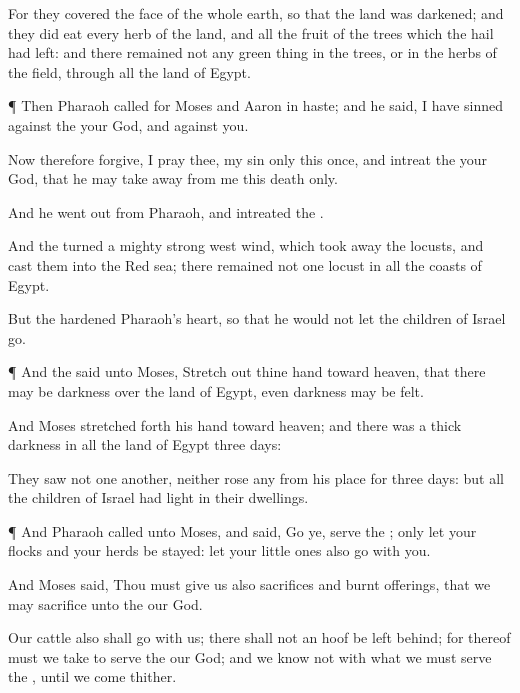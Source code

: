 {For they
covered the
face of the whole
earth, so that the
land was
darkened; and they did
eat every
herb of the
land, and all the
fruit of the
trees which the
hail had
left: and there
remained not any green
thing in the
trees, or in the
herbs of the
field, through all the
land of
Egypt.


\par }{\PP {}¶ Then
Pharaoh
called for
Moses and
Aaron in
haste; and he
said, I have
sinned against the
{} your
God, and against you.

Now therefore
forgive, I pray thee, my
sin only this
once, and
intreat the
{} your
God, that he may take
away from me this
death only.

And he went
out from
Pharaoh, and
intreated the
{}.

And the
{}
turned a
mighty
strong
west
wind, which took
away the
locusts, and
cast them into the
Red
sea; there
remained not
one
locust in all the
coasts of
Egypt.

But the
{}
hardened
Pharaoh’s
heart, so that he would not let the
children of
Israel
go.


\par }{\PP {}¶ And the
{}
said unto
Moses, Stretch
out thine
hand toward
heaven, that there may be
darkness over the
land of
Egypt, even
darkness
{} may be
felt.

And
Moses stretched
forth his
hand toward
heaven; and there was a
thick
darkness in all the
land of
Egypt
three
days:

They
saw not
one
another, neither
rose
any from his place for
three
days: but all the
children of
Israel had
light in their
dwellings.


\par }{\PP {}¶ And
Pharaoh
called unto
Moses, and
said,
Go ye,
serve the
{}; only let your
flocks and your
herds be
stayed: let your little
ones also
go with you.

And
Moses
said, Thou must
give
us also
sacrifices and burnt
offerings, that we may
sacrifice unto the
{} our
God.

Our
cattle also shall
go with us; there shall not an
hoof be left
behind; for thereof must we
take to
serve the
{} our
God; and we
know not with what we must
serve the
{}, until we
come thither.


}
